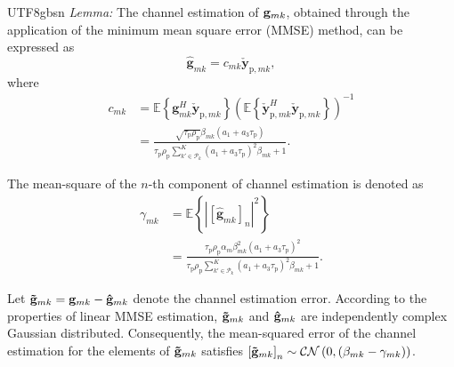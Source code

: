\documentclass[lettersize,journal]{IEEEtran}
\begin{document}
\begin{CJK}{UTF8}{gbsn}
\textit{Lemma:}
The channel estimation of ${{\bf{g}}_{mk}}$, obtained through the application of the minimum mean square error (MMSE) method, can be expressed as 
\begin{equation}\label{eqn-6}
\mathbf{\hat{g} }_{mk} = c_{mk} \mathbf{\check{y} }_{\text{p},mk},
\end{equation}
where 
\begin{align}\label{eqn-7}
{c_{mk}} &= \mathbb{E}\left \{ \mathbf{g}_{mk}^H\mathbf{\check{y} }_{\text{p},mk}   \right \} \left ( \mathbb{E}\left \{  \mathbf{\check{y} }_{\text{p},mk}^H\mathbf{\check{y} }_{\text{p},mk}\right \}   \right )^{-1}   \nonumber \\
&= \frac{{\sqrt {{\tau _\text{p}}{\rho _\text{p}}} {\beta _{mk}}({a _1} + {a _3}{\tau _\text{p}})}}{{{\tau _\text{p}}{\rho _\text{p}}\sum_{k'\in \mathcal{P}_k }^{K} ({a _1} + {a _3}{\tau _\text{p}})^2{\beta _{mk}} + 1}}.
\end{align}

The mean-square of the $n$-th component of channel estimation is denoted as
\begin{align}\label{eqn-8}
\gamma_{m k}&=\mathbb{E}\left \{ \left | \left [ \mathbf{\hat{g} }_{mk}  \right ]_n  \right |^2  \right \}\nonumber \\ &=\frac{\tau_\text{p} \rho_\text{p} \alpha_{m} \beta_{m k}^{2}\left(a_{1}+a_{3} \tau_\text{p}\right)^{2}}{\tau_\text{p} \rho_\text{p}\sum_{k'\in \mathcal{P}_k }^{K} \left(a_{1}+a_{3} \tau_\text{p}\right)^2 \beta_{m k}+1}.
\end{align}

Let ${{\bf{\tilde g}}_{mk}} = {{\bf{g}}_{mk}} - {{\bf{\hat g}}_{mk}}$ denote the channel estimation error. According to the properties of linear MMSE estimation, ${{\bf{\tilde g}}_{mk}}$ and ${{\bf{\hat g}}_{mk}}$ are independently complex Gaussian distributed. Consequently, the mean-squared error of the channel estimation for the elements of ${{\bf{\tilde g}}_{mk}}$ satisfies $\left [ {{\bf{\tilde g}}_{mk}} \right ]_n\sim \mathcal{CN} \left ( 0, \left ( \beta _{mk}-\gamma _{mk} \right ) \right ) $.

\end{CJK}
\end{document}
